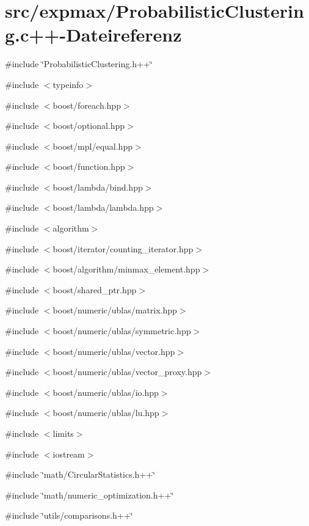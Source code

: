 \hypertarget{ProbabilisticClustering_8c_09_09}{
\section{src/expmax/ProbabilisticClustering.c++-\/Dateireferenz}
\label{ProbabilisticClustering_8c_09_09}
}
{\ttfamily \#include \char`\"{}ProbabilisticClustering.h++\char`\"{}}\par
{\ttfamily \#include $<$typeinfo$>$}\par
{\ttfamily \#include $<$boost/foreach.hpp$>$}\par
{\ttfamily \#include $<$boost/optional.hpp$>$}\par
{\ttfamily \#include $<$boost/mpl/equal.hpp$>$}\par
{\ttfamily \#include $<$boost/function.hpp$>$}\par
{\ttfamily \#include $<$boost/lambda/bind.hpp$>$}\par
{\ttfamily \#include $<$boost/lambda/lambda.hpp$>$}\par
{\ttfamily \#include $<$algorithm$>$}\par
{\ttfamily \#include $<$boost/iterator/counting\_\-iterator.hpp$>$}\par
{\ttfamily \#include $<$boost/algorithm/minmax\_\-element.hpp$>$}\par
{\ttfamily \#include $<$boost/shared\_\-ptr.hpp$>$}\par
{\ttfamily \#include $<$boost/numeric/ublas/matrix.hpp$>$}\par
{\ttfamily \#include $<$boost/numeric/ublas/symmetric.hpp$>$}\par
{\ttfamily \#include $<$boost/numeric/ublas/vector.hpp$>$}\par
{\ttfamily \#include $<$boost/numeric/ublas/vector\_\-proxy.hpp$>$}\par
{\ttfamily \#include $<$boost/numeric/ublas/io.hpp$>$}\par
{\ttfamily \#include $<$boost/numeric/ublas/lu.hpp$>$}\par
{\ttfamily \#include $<$limits$>$}\par
{\ttfamily \#include $<$iostream$>$}\par
{\ttfamily \#include \char`\"{}math/CircularStatistics.h++\char`\"{}}\par
{\ttfamily \#include \char`\"{}math/numeric\_\-optimization.h++\char`\"{}}\par
{\ttfamily \#include \char`\"{}utils/comparisons.h++\char`\"{}}\par
